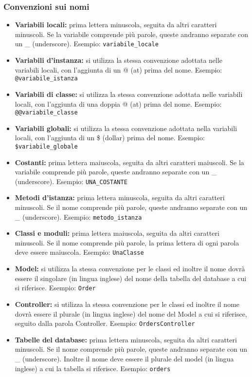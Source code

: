 \documentclass[11pt,a4paper]{article}
\begin{document}
\subsubsection{Convenzioni sui nomi}
\begin{itemize}
\item\textbf{Variabili locali:}
prima lettera minuscola, seguita da altri caratteri minuscoli. Se la variabile comprende più parole, queste andranno separate con un \_ (underscore). Esempio: \texttt{variabile\_locale}
\item\textbf{Variabili d'instanza:}
si utilizza la stessa convenzione adottata nelle variabili locali, con l’aggiunta
di un @ (at) prima del nome. Esempio: \texttt{@variabile\_istanza}
\item\textbf{Variabili di classe:}
si utilizza la stessa convenzione adottata nelle variabili locali, con l’aggiunta
di una doppia @ (at) prima del nome. Esempio: \texttt{@@variabile\_classe}
\item\textbf{Variabili globali:}
si utilizza la stessa convenzione adottata nella variabili locali, con l’aggiunta
di un \$ (dollar) prima del nome. Esempio: \texttt{\$variabile\_globale}
\item\textbf{Costanti:}
prima lettera maiuscola, seguita da altri caratteri maiuscoli. Se la variabile comprende più parole, queste andranno separate con un \_ (underscore). Esempio: \texttt{UNA\_COSTANTE}
\item\textbf{Metodi d'istanza:}
prima lettera minuscola, seguita da altri caratteri minuscoli. Se il nome comprende più parole, queste andranno separate con un \_ (underscore). Esempio: \texttt{metodo\_istanza}
\item\textbf{Classi e moduli:}
prima lettera maiuscola, seguita da altri caratteri minuscoli. Se il nome
comprende più parole, la prima lettera di ogni parola deve essere maiuscola. Esempio: \texttt{UnaClasse}
\item\textbf{Model:}
si utilizza la stessa convenzione per le classi ed inoltre il nome dovrà essere il singolare (in lingua inglese) del nome della tabella del database a cui si riferisce. Esempio: \texttt{Order}
\item\textbf{Controller:}
si utilizza la stessa convenzione per le classi ed inoltre il nome dovrà essere il plurale (in lingua inglese) del nome del Model a cui si riferisce, seguito dalla parola Controller. Esempio: \texttt{OrdersController}
\item\textbf{Tabelle del database:}
prima lettera minuscola, seguita da altri caratteri minuscoli. Se il nome comprende più parole, queste andranno separate con un \_ (underscore). Inoltre il nome deve essere il plurale del model (in lingua inglese) a cui la tabella si riferisce. Esempio: \texttt{orders}

\end{itemize}
\end{document}
